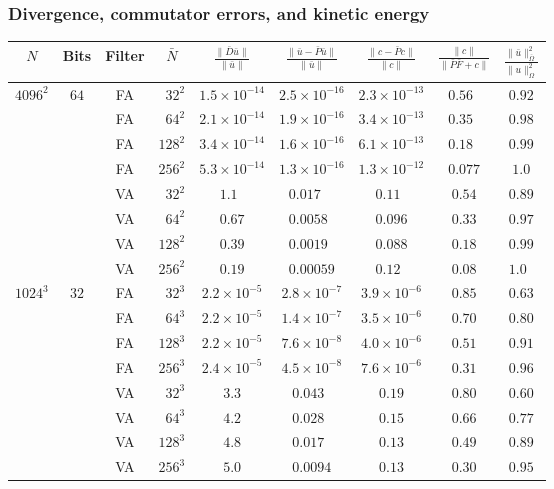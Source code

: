\documentclass[preprint]{elsarticle}
\newcommand{\p}{\phantom{0}}
\newcommand{\e}[1]{\times 10^{#1}}
\newcommand{\revboth}[1]{#1}
\begin{document}
\subsubsection{Divergence, commutator errors, and kinetic energy}

\begin{table}
    \centering
    \begin{tabular}{*{9}{c}}
    \toprule

    $N$
    & Bits
    & Filter
    & $\bar{N}$
    & $\frac{\| \bar{D} \bar{u} \|}{\| \bar{u} \|}$
    & $\frac{\| \bar{u} - \bar{P} \bar{u} \|}{\| \bar{u} \|}$
    & $\frac{\| c - \bar{P} c \|}{\| c \|}$
    & $\frac{\| c \|}{\| \bar{P} \bar{F} + c \|}$
    & $\frac{\| \bar{u} \|^2_{\bar{\Omega}}}{\| u \|^2_\Omega}$ \\

    \midrule

    \multirow{8}{*}{$4096^2$} &
    \multirow{8}{*}{$64$} &
        FA & $\p32^2$ & $1.5\e{-14}$ & $2.5\e{-16}$ & $2.3\e{-13}$ & $0.56\p$ & $0.92$  \\
    & & FA & $\p64^2$ & $2.1\e{-14}$ & $1.9\e{-16}$ & $3.4\e{-13}$ & $0.35\p$ & $0.98$  \\
    & & FA &  $128^2$ & $3.4\e{-14}$ & $1.6\e{-16}$ & $6.1\e{-13}$ & $0.18\p$ & $0.99$  \\
    & & FA &  $256^2$ & $5.3\e{-14}$ & $1.3\e{-16}$ & $1.3\e{-12}$ & $0.077 $ & $1.0$\p \\
    & & VA & $\p32^2$ & $1.1\p$      & $0.017\p\p$  & $0.11\p$     & $0.54$   & $0.89$  \\
    & & VA & $\p64^2$ & $0.67$       & $0.0058\p$   & $0.096$      & $0.33$   & $0.97$  \\
    & & VA &  $128^2$ & $0.39$       & $0.0019\p$   & $0.088$      & $0.18$   & $0.99$  \\
    & & VA &  $256^2$ & $0.19$       & $0.00059$    & $0.12\p$     & $0.08$   & $1.0\p$ \\
    \midrule

    \multirow{8}{*}{$1024^3$} &
    \multirow{8}{*}{$32$} &
        FA & $\p32^3$ & $2.2\e{-5}$ & $2.8\e{-7}$ & $3.9\e{-6}$ & $0.85$ & $0.63$ \\
    & & FA & $\p64^3$ & $2.2\e{-5}$ & $1.4\e{-7}$ & $3.5\e{-6}$ & $0.70$ & $0.80$ \\
    & & FA & $128^3$  & $2.2\e{-5}$ & $7.6\e{-8}$ & $4.0\e{-6}$ & $0.51$ & $0.91$ \\
    & & FA & $256^3$  & $2.4\e{-5}$ & $4.5\e{-8}$ & $7.6\e{-6}$ & $0.31$ & $0.96$ \\
    & & VA & $\p32^3$ & $3.3$       & $0.043\p$   & $0.19$      & $0.80$ & $0.60$ \\
    & & VA & $\p64^3$ & $4.2$       & $0.028\p$   & $0.15$      & $0.66$ & $0.77$ \\
    & & VA & $128^3$  & $4.8$       & $0.017\p$   & $0.13$      & $0.49$ & $0.89$ \\
    & & VA & $256^3$  & $5.0$       & $0.0094$    & $0.13$      & $0.30$ & $0.95$ \\


\end{tabular}
\end{table}
\end{document}

